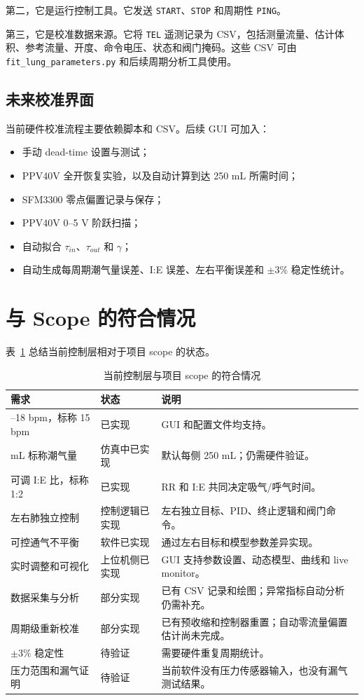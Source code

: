 \documentclass[UTF8,11pt,a4paper]{ctexart}
\begin{document}
第二，它是运行控制工具。它发送 \texttt{START}、\texttt{STOP} 和周期性 \texttt{PING}。

第三，它是校准数据来源。它将 \texttt{TEL} 遥测记录为 CSV，包括测量流量、估计体积、参考流量、开度、命令电压、状态和阀门掩码。这些 CSV 可由 \texttt{fit\_lung\_parameters.py} 和后续周期分析工具使用。

\subsection{未来校准界面}

当前硬件校准流程主要依赖脚本和 CSV。后续 GUI 可加入：
\begin{itemize}
  \item 手动 dead-time 设置与测试；
  \item PPV40V 全开恢复实验，以及自动计算到达 250 mL 所需时间；
  \item SFM3300 零点偏置记录与保存；
  \item PPV40V 0--5 V 阶跃扫描；
  \item 自动拟合 $\tau_{in}$、$\tau_{out}$ 和 $\gamma$；
  \item 自动生成每周期潮气量误差、I:E 误差、左右平衡误差和 $\pm3\%$ 稳定性统计。
\end{itemize}

\section{与 Scope 的符合情况}

表~\ref{tab:scope} 总结当前控制层相对于项目 scope 的状态。

\begin{table}[H]
\centering
\caption{当前控制层与项目 scope 的符合情况}
\label{tab:scope}
\small
\begin{tabularx}{\textwidth}{
  >{\raggedright\arraybackslash}p{4.7cm}
  >{\centering\arraybackslash}p{2.5cm}
  X
}
\toprule
\textbf{需求} & \textbf{状态} & \textbf{说明} \\
\midrule
12--18 bpm，标称 15 bpm & 已实现 & GUI 和配置文件均支持。 \\
500 mL 标称潮气量 & 仿真中已实现 & 默认每侧 250 mL；仍需硬件验证。 \\
可调 I:E 比，标称 1:2 & 已实现 & RR 和 I:E 共同决定吸气/呼气时间。 \\
左右肺独立控制 & 控制逻辑已实现 & 左右独立目标、PID、终止逻辑和阀门命令。 \\
可控通气不平衡 & 软件已实现 & 通过左右目标和模型参数差异实现。 \\
实时调整和可视化 & 上位机侧已实现 & GUI 支持参数设置、动态模型、曲线和 live monitor。 \\
数据采集与分析 & 部分实现 & 已有 CSV 记录和绘图；异常指标自动分析仍需补充。 \\
周期级重新校准 & 部分实现 & 已有预收缩和控制器重置；自动零流量偏置估计尚未完成。 \\
$\pm3\%$ 稳定性 & 待验证 & 需要硬件重复周期统计。 \\
压力范围和漏气证明 & 待验证 & 当前软件没有压力传感器输入，也没有漏气测试结果。 \\
\bottomrule
\end{tabularx}
\end{table}
\end{document}
